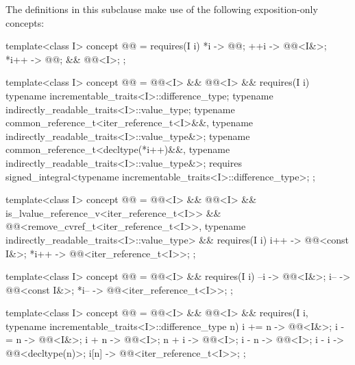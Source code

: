 \pnum
The definitions in this subclause make use of the following
exposition-only concepts:

\begin{codeblock}
template<class I>
concept @@ =
  requires(I i) {
    {   *i } -> @@;
    {  ++i } -> @@<I&>;
    { *i++ } -> @@;
    && @@<I>;
  };

template<class I>
concept @@ =
  @@<I> && @@<I> && requires(I i) {
    typename incrementable_traits<I>::difference_type;
    typename indirectly_readable_traits<I>::value_type;
    typename common_reference_t<iter_reference_t<I>&&,
                                typename indirectly_readable_traits<I>::value_type&>;
    typename common_reference_t<decltype(*i++)&&,
                                typename indirectly_readable_traits<I>::value_type&>;
    requires signed_integral<typename incrementable_traits<I>::difference_type>;
  };

template<class I>
concept @@ =
  @@<I> && @@<I> &&
  is_lvalue_reference_v<iter_reference_t<I>> &&
  @@<remove_cvref_t<iter_reference_t<I>>,
          typename indirectly_readable_traits<I>::value_type> &&
  requires(I i) {
    {  i++ } -> @@<const I&>;
    { *i++ } -> @@<iter_reference_t<I>>;
  };

template<class I>
concept @@ =
  @@<I> && requires(I i) {
    {  --i } -> @@<I&>;
    {  i-- } -> @@<const I&>;
    { *i-- } -> @@<iter_reference_t<I>>;
  };

template<class I>
concept @@ =
  @@<I> && @@<I> &&
  requires(I i, typename incrementable_traits<I>::difference_type n) {
    { i += n } -> @@<I&>;
    { i -= n } -> @@<I&>;
    { i +  n } -> @@<I>;
    { n +  i } -> @@<I>;
    { i -  n } -> @@<I>;
    { i -  i } -> @@<decltype(n)>;
    {  i[n]  } -> @@<iter_reference_t<I>>;
  };
\end{codeblock}

